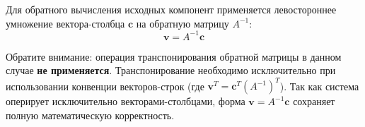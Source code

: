 \documentclass[12pt,a4paper]{article}
\begin{document}
Для обратного вычисления исходных компонент применяется левостороннее умножение вектора-столбца $\mathbf{c}$ на обратную матрицу $A^{-1}$:
\begin{equation}
\mathbf{v} = A^{-1} \mathbf{c}
\end{equation}

Обратите внимание: операция транспонирования обратной матрицы в данном случае \textbf{не применяется}. Транспонирование необходимо исключительно при использовании конвенции векторов-строк (где $\mathbf{v}^T = \mathbf{c}^T (A^{-1})^T$). Так как система оперирует исключительно векторами-столбцами, форма $\mathbf{v} = A^{-1} \mathbf{c}$ сохраняет полную математическую корректность.
\end{document}
